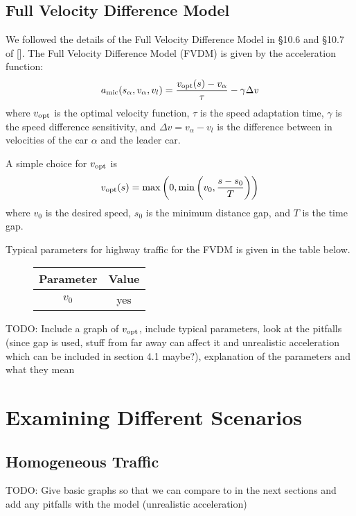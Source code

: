 \documentclass[12pt]{article}
\begin{document}
    \subsection{Full Velocity Difference Model}\label{ch3.1}
    We followed the details of the Full Velocity Difference Model in \S 10.6 and \S 10.7 of [\cite{traffic}]. The Full Velocity Difference Model (FVDM) is given by the acceleration function: 
    \begin{equation} 
      a_{\rm mic}(s_\alpha,v_\alpha,v_l) = \frac{v_{\rm opt} (s) - v_\alpha}{\tau} - \gamma \Delta v 
    \end{equation}
    where $v_{\rm opt}$ is the optimal velocity function, $\tau$ is the speed adaptation time, $\gamma$ is the speed difference sensitivity, and $\Delta v = v_\alpha - v_l$ is the difference between in velocities of the car $\alpha$ and the leader car.
    
    A simple choice for $v_{\rm opt}$ is 
    \begin{equation} 
      v_{\rm opt} (s) = \max \left( 0, \min \left( v_0, \frac{s-s_0}{T} \right) \right)
    \end{equation}
    where $v_0$ is the desired speed, $s_0$ is the minimum distance gap, and $T$ is the time gap. 

    Typical parameters for highway traffic for the FVDM is given in the table below. 
    \begin{figure}[H]
      \begin{center}
        \begin{tabular}{ c c } 
        Parameter & Value \\
        \hline
        $v_0$ & yes \\
        \end{tabular}
        \end{center}
    \end{figure}
    TODO: Include a graph of $v_{\rm opt}$, include typical parameters, look at the pitfalls (since gap is used, stuff from far away can affect it and unrealistic acceleration which can be included in section 4.1 maybe?), explanation of the parameters and what they mean 
    \section{Examining Different Scenarios}
    \subsection{Homogeneous Traffic}
    TODO: Give basic graphs so that we can compare to in the next sections and add any pitfalls with the model (unrealistic acceleration) 
\end{document}
